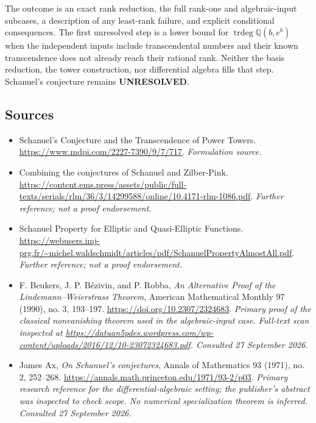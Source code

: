 \documentclass[11pt]{article}
\begin{document}
The outcome is an exact rank reduction, the full rank-one and algebraic-input
subcases, a description of any least-rank failure, and explicit conditional
consequences. The first unresolved step is a lower bound for
$\operatorname{trdeg}\mathbb Q(b,e^b)$ when the independent inputs include
transcendental numbers and their known transcendence does not already reach
their rational rank. Neither the basis reduction, the tower construction,
nor differential algebra fills that step. Schanuel's conjecture remains
\textbf{UNRESOLVED}.

\subsection{Sources}
\begin{itemize}
\item[S1]Schanuel's Conjecture and the Transcendence of Power Towers.
\url{https://www.mdpi.com/2227-7390/9/7/717}.
\textit{Formulation source.}
\item[S2]Combining the conjectures of Schanuel and Zilber-Pink.
\url{https://content.ems.press/assets/public/full-texts/serials/rlm/36/3/14299588/online/10.4171-rlm-1086.pdf}.
\textit{Further reference; not a proof endorsement.}
\item[S3]Schanuel Property for Elliptic and Quasi-Elliptic Functions.
\url{https://webusers.imj-prg.fr/~michel.waldschmidt/articles/pdf/SchanuelPropertyAlmostAll.pdf}.
\textit{Further reference; not a proof endorsement.}

\item[E1]F. Beukers, J. P. B\'ezivin, and P. Robba,
\emph{An Alternative Proof of the Lindemann--Weierstrass Theorem},
American Mathematical Monthly 97 (1990), no. 3, 193--197.
\url{https://doi.org/10.2307/2324683}.
\textit{Primary proof of the classical nonvanishing theorem used in the
algebraic-input case. Full-text scan inspected at
\url{https://datuan5pdes.wordpress.com/wp-content/uploads/2016/12/10-23072324683.pdf}.
Consulted 27 September 2026.}
\item[E2]James Ax, \emph{On Schanuel's conjectures},
Annals of Mathematics 93 (1971), no. 2, 252--268.
\url{https://annals.math.princeton.edu/1971/93-2/p03}.
\textit{Primary research reference for the differential-algebraic setting;
the publisher's abstract was inspected to check scope. No numerical
specialization theorem is inferred. Consulted 27 September 2026.}
\end{itemize}
\end{document}
